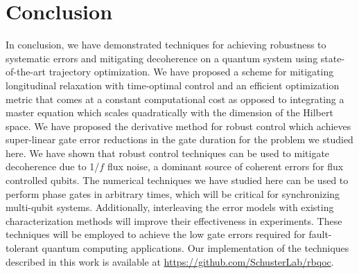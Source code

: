 \section{Conclusion}
In conclusion, we have demonstrated techniques for achieving robustness to systematic
errors and mitigating decoherence on a quantum system using state-of-the-art trajectory
optimization. We have proposed a scheme for mitigating longitudinal relaxation with time-optimal
control and an efficient optimization metric that comes at a constant computational cost as
opposed to integrating a master equation which scales quadratically with
the dimension of the Hilbert space.
We have proposed the derivative method for robust control which achieves
super-linear gate error reductions in the gate duration for the problem we studied here.
We have shown that robust control techniques can be used to mitigate decoherence due
to 1/$f$ flux noise, a dominant source of coherent errors for flux controlled qubits.
The numerical techniques we have studied here can be used to perform phase gates in arbitrary times,
which will be critical for synchronizing multi-qubit systems. Additionally,
interleaving the error models with existing
characterization methods will improve their effectiveness in experiments.
These techniques will be employed to achieve the low gate errors
required for fault-tolerant quantum computing applications. Our
implementation of the techniques described in this work is available
at \url{https://github.com/SchusterLab/rbqoc}.
